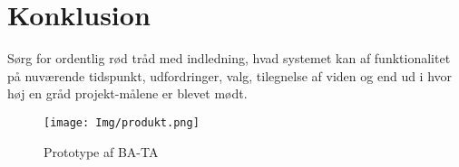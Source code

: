 \graphicspath{{Chapters/Konklusion/}}


\section{Konklusion}



Sørg for ordentlig rød tråd med indledning, hvad systemet kan af funktionalitet på nuværende tidspunkt, udfordringer, valg, tilegnelse af viden og end ud i hvor høj en gråd projekt-målene er blevet mødt.


\begin{figure}[H]
	\centering
	\texttt{[image: Img/produkt.png]}
	\caption{Prototype af BA-TA}
	\label{fig:prototypeBATA}
\end{figure}